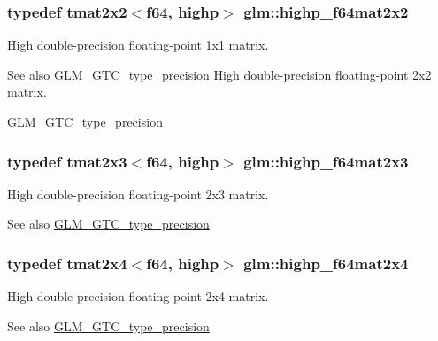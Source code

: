 \subsubsection[{highp\+\_\+f64mat2x2}]{\setlength{\rightskip}{0pt plus 5cm}typedef tmat2x2$<${\bf f64}, highp$>$ {\bf glm\+::highp\+\_\+f64mat2x2}}\label{namespaceglm_ab1d0281d417a194926995187e2d72f94}
High double-\/precision floating-\/point 1x1 matrix. \begin{DoxySeeAlso}{See also}
\hyperlink{group__gtc__type__precision}{G\+L\+M\+\_\+\+G\+T\+C\+\_\+type\+\_\+precision} High double-\/precision floating-\/point 2x2 matrix. 

\hyperlink{group__gtc__type__precision}{G\+L\+M\+\_\+\+G\+T\+C\+\_\+type\+\_\+precision} 
\end{DoxySeeAlso}
\hypertarget{namespaceglm_a129f841fdcfda7a4e8d69e8b62989320}{}
\subsubsection[{highp\+\_\+f64mat2x3}]{\setlength{\rightskip}{0pt plus 5cm}typedef tmat2x3$<${\bf f64}, highp$>$ {\bf glm\+::highp\+\_\+f64mat2x3}}\label{namespaceglm_a129f841fdcfda7a4e8d69e8b62989320}
High double-\/precision floating-\/point 2x3 matrix. \begin{DoxySeeAlso}{See also}
\hyperlink{group__gtc__type__precision}{G\+L\+M\+\_\+\+G\+T\+C\+\_\+type\+\_\+precision} 
\end{DoxySeeAlso}
\hypertarget{namespaceglm_aa92098382f2b39d4cd111868459e0a5a}{}
\subsubsection[{highp\+\_\+f64mat2x4}]{\setlength{\rightskip}{0pt plus 5cm}typedef tmat2x4$<${\bf f64}, highp$>$ {\bf glm\+::highp\+\_\+f64mat2x4}}\label{namespaceglm_aa92098382f2b39d4cd111868459e0a5a}
High double-\/precision floating-\/point 2x4 matrix. \begin{DoxySeeAlso}{See also}
\hyperlink{group__gtc__type__precision}{G\+L\+M\+\_\+\+G\+T\+C\+\_\+type\+\_\+precision} 
\end{DoxySeeAlso}
\hypertarget{namespaceglm_a00c5743b0eba6b437422571f4eda27b8}{}
